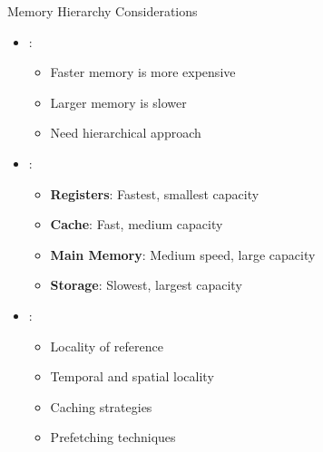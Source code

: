 \begin{frame}{Memory Hierarchy Considerations}
\begin{itemize}
\item {}:
\begin{itemize}
\item Faster memory is more expensive
\item Larger memory is slower
\item Need hierarchical approach
\end{itemize}
\vspace{0.5cm}
\item {}:
\begin{itemize}
\item \textbf{Registers}: Fastest, smallest capacity
\item \textbf{Cache}: Fast, medium capacity
\item \textbf{Main Memory}: Medium speed, large capacity
\item \textbf{Storage}: Slowest, largest capacity
\end{itemize}
\vspace{0.3cm}
\item {}:
\begin{itemize}
\item Locality of reference
\item Temporal and spatial locality
\item Caching strategies
\item Prefetching techniques
\end{itemize}
\end{itemize}
\end{frame}


